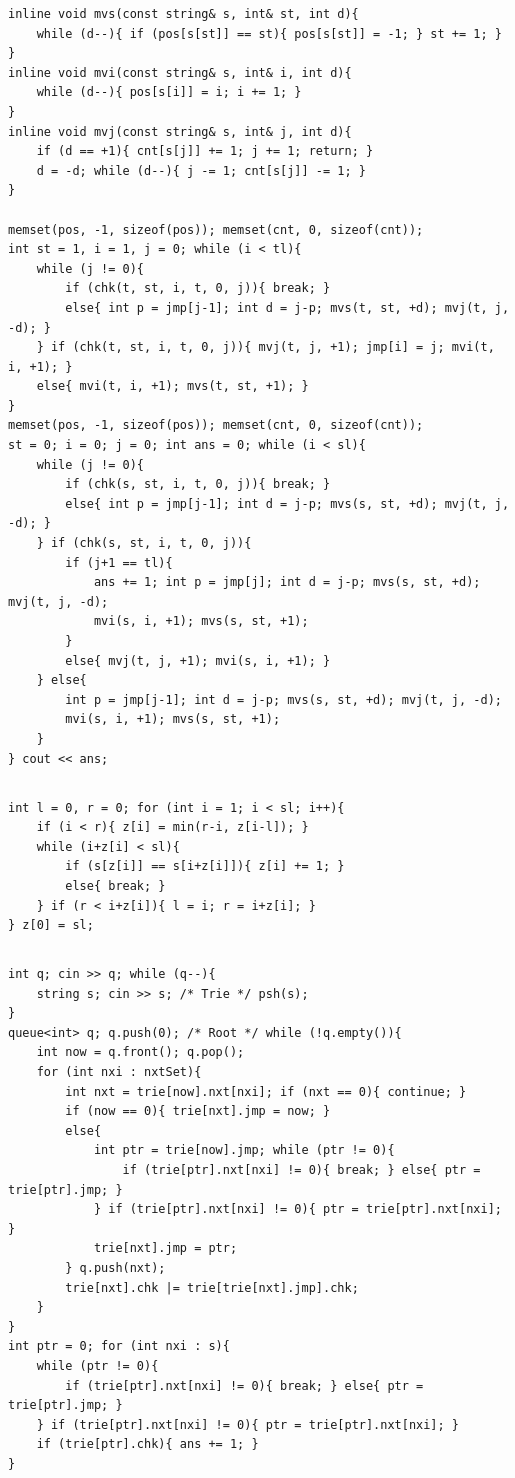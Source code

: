 \documentclass[landscape, 8pt, a4paper, oneside]{extarticle}
\begin{document}
\begin{multicols*}{3}
\begin{verbatim}
inline void mvs(const string& s, int& st, int d){
	while (d--){ if (pos[s[st]] == st){ pos[s[st]] = -1; } st += 1; }
}
inline void mvi(const string& s, int& i, int d){
	while (d--){ pos[s[i]] = i; i += 1; }
}
inline void mvj(const string& s, int& j, int d){
	if (d == +1){ cnt[s[j]] += 1; j += 1; return; }
	d = -d; while (d--){ j -= 1; cnt[s[j]] -= 1; }
}

memset(pos, -1, sizeof(pos)); memset(cnt, 0, sizeof(cnt));
int st = 1, i = 1, j = 0; while (i < tl){
	while (j != 0){
		if (chk(t, st, i, t, 0, j)){ break; }
		else{ int p = jmp[j-1]; int d = j-p; mvs(t, st, +d); mvj(t, j, -d); }
	} if (chk(t, st, i, t, 0, j)){ mvj(t, j, +1); jmp[i] = j; mvi(t, i, +1); }
	else{ mvi(t, i, +1); mvs(t, st, +1); }
}
memset(pos, -1, sizeof(pos)); memset(cnt, 0, sizeof(cnt));
st = 0; i = 0; j = 0; int ans = 0; while (i < sl){
	while (j != 0){
		if (chk(s, st, i, t, 0, j)){ break; }
		else{ int p = jmp[j-1]; int d = j-p; mvs(s, st, +d); mvj(t, j, -d); }
	} if (chk(s, st, i, t, 0, j)){
		if (j+1 == tl){
			ans += 1; int p = jmp[j]; int d = j-p; mvs(s, st, +d); mvj(t, j, -d);
			mvi(s, i, +1); mvs(s, st, +1);
		}
		else{ mvj(t, j, +1); mvi(s, i, +1); }
	} else{
		int p = jmp[j-1]; int d = j-p; mvs(s, st, +d); mvj(t, j, -d);
		mvi(s, i, +1); mvs(s, st, +1);
	}
} cout << ans;
\end{verbatim}
\subsection{}
\begin{verbatim}
int l = 0, r = 0; for (int i = 1; i < sl; i++){
	if (i < r){ z[i] = min(r-i, z[i-l]); }
	while (i+z[i] < sl){
		if (s[z[i]] == s[i+z[i]]){ z[i] += 1; }
		else{ break; }
	} if (r < i+z[i]){ l = i; r = i+z[i]; }
} z[0] = sl;
\end{verbatim}
\subsection{}
\begin{verbatim}
int q; cin >> q; while (q--){
	string s; cin >> s; /* Trie */ psh(s);
}
queue<int> q; q.push(0); /* Root */ while (!q.empty()){
	int now = q.front(); q.pop();
	for (int nxi : nxtSet){
		int nxt = trie[now].nxt[nxi]; if (nxt == 0){ continue; }
		if (now == 0){ trie[nxt].jmp = now; }
		else{
			int ptr = trie[now].jmp; while (ptr != 0){
				if (trie[ptr].nxt[nxi] != 0){ break; } else{ ptr = trie[ptr].jmp; }
			} if (trie[ptr].nxt[nxi] != 0){ ptr = trie[ptr].nxt[nxi]; }
			trie[nxt].jmp = ptr;
		} q.push(nxt);
		trie[nxt].chk |= trie[trie[nxt].jmp].chk;
	}
}
int ptr = 0; for (int nxi : s){
	while (ptr != 0){
		if (trie[ptr].nxt[nxi] != 0){ break; } else{ ptr = trie[ptr].jmp; }
	} if (trie[ptr].nxt[nxi] != 0){ ptr = trie[ptr].nxt[nxi]; }
	if (trie[ptr].chk){ ans += 1; }
}
\end{verbatim}

\end{multicols*}
\end{document}
